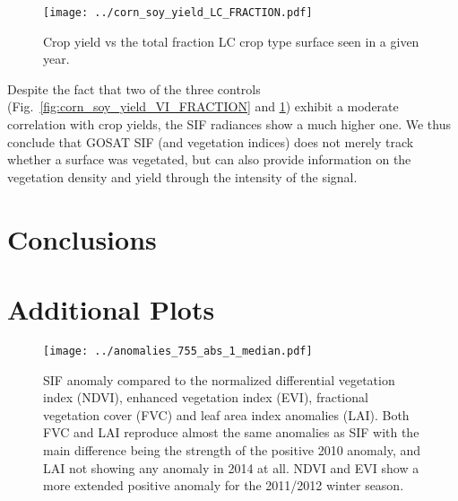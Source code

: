 \documentclass[preprint, a4paper, 10pt, times]{elsarticle}
\begin{document}
\begin{figure}[htbp]
\centering
\texttt{[image: ../corn\_soy\_yield\_LC\_FRACTION.pdf]}
\caption{Crop yield vs the total fraction LC crop type surface seen in a given year.}
\label{fig:corn_soy_yield_LC_FRACTION}
\end{figure}

Despite the fact that two of the three controls (Fig.~\ref{fig:corn_soy_yield_VI_FRACTION} and \ref{fig:corn_soy_yield_LC_FRACTION}) exhibit a moderate correlation with crop yields, the SIF radiances show a much higher one. We thus conclude that GOSAT SIF (and vegetation indices) does not merely track whether a surface was vegetated, but can also provide information on the vegetation density and yield through the intensity of the signal. 


\section{Conclusions}



\section*{}


\appendix
\section{Additional Plots}

\begin{figure}[htbp]
\centering
\texttt{[image: ../anomalies\_755\_abs\_1\_median.pdf]}
\caption{SIF anomaly compared to the normalized differential vegetation index (NDVI), enhanced vegetation index (EVI), fractional vegetation cover (FVC) and leaf area index anomalies (LAI). Both FVC and LAI reproduce almost the same anomalies as SIF with the main difference being the strength of the positive 2010 anomaly, and LAI not showing any anomaly in 2014 at all. NDVI and EVI show a more extended positive anomaly for the 2011/2012 winter season.}
\label{fig:anomalies_vi}
\end{figure}
\end{document}
